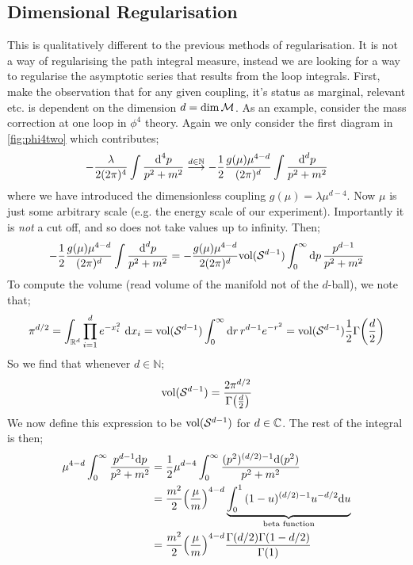 \subsection{Dimensional Regularisation}
This is qualitatively different to the previous methods of regularisation. It is not a way of regularising the path integral measure, instead we are looking for a way to regularise the asymptotic series that results from the loop integrals. First, make the observation that for any given coupling, it's status as marginal, relevant etc. is dependent on the dimension $d = \dim \mathcal{M}$. As an example, consider the mass correction at one loop in $\phi^4$ theory. Again we only consider the first diagram in \autoref{fig:phi4two} which contributes;
\begin{equation*}
-\frac{\lambda}{2(2\pi)^4}\int{\frac{\text{d}^4 p}{p^2 + m^2}} \overset{d \in \mathbb{N}}{\longrightarrow} - \frac{1}{2}\frac{g(\mu) \mu^{4 - d}}{(2\pi)^d} \int{\frac{\text{d}^d p}{p^2 + m^2}}
\end{equation*}
where we have introduced the dimensionless coupling $g(\mu) = \lambda \mu^{d - 4}$. Now $\mu$ is just some arbitrary scale (e.g. the energy scale of our experiment). Importantly it is \emph{not} a cut off, and so does not take values up to infinity. Then;
\begin{equation*}
-\frac{1}{2}\frac{g(\mu)\mu^{4 - d}}{(2\pi)^{d}}\int{\frac{\text{d}^d p}{p^2 + m^2}} = -\frac{g(\mu) \mu^{4 - d}}{2(2\pi)^{d}}\text{vol}(\mathcal{S}^{d - 1})\int_0^{\infty}{\text{d}p \,\frac{p^{d - 1}}{p^2 + m^2}}
\end{equation*}
To compute the volume (read volume of the manifold not of the $d$-ball), we note that;
\begin{equation*}
\pi^{d/2} = \int_{\RR^{d}}{\prod_{i = 1}^{d}{e^{-x_i^2}}\,\,\ud x_i} = \text{vol}(\mS^{d - 1})\int_0^{\infty}{\upd{r}r^{d - 1}e^{-r^2}} = \text{vol}(\mS^{d - 1})\frac{1}{2}\Gamma\left(\frac{d}{2}\right)
\end{equation*}
So we find that whenever $d \in \mathbb{N}$;
\begin{equation}
\text{vol}(\mS^{d - 1}) = \frac{2\pi^{d/2}}{\Gamma\left(\frac{d}{2}\right)}
\end{equation}
We now define this expression to be $\text{vol}(\mathcal{S}^{d - 1})$ for $d \in \mathbb{C}$. The rest of the integral is then;
\begin{align*}
\mu^{4 - d}\int_0^{\infty}{\frac{p^{d - 1}\ud p}{p^2 + m^2}} &= \frac{1}{2}\mu^{d - 4}\int_0^{\infty}{\frac{(p^2)^{(d/2) - 1}\ud (p^2)}{p^2 + m^2}} \\
&= \frac{m^2}{2}\left(\frac{\mu}{m}\right)^{4 - d} \underbrace{\int_0^{1}{(1 - u)^{(d/2) - 1}u^{-d/2}\ud u}}_{\text{beta function}} \\
&= \frac{m^2}{2}\left(\frac{\mu}{m}\right)^{4 - d} \frac{\Gamma(d/2) \Gamma(1 - d/2)}{\Gamma(1)}
\end{align*}
